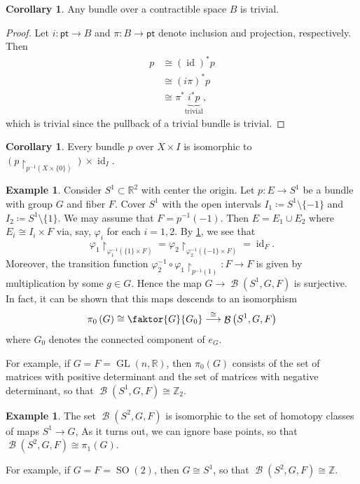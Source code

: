 \documentclass[10pt,letterpaper,cm]{nupset}
\theoremstyle{definition}
\newtheorem{exmp}[defn]{Example}
\theoremstyle{theorem}
\newtheorem{corollary}[defn]{Corollary}
\theoremstyle{remark}
\newcommand{\R}{\mathbb{R}}
\newcommand{\Z}{\mathbb Z}
\newcommand{\1}{\mathbb{1}}
\newcommand{\0}{\vec 0}
\newcommand{\pt}{\mathsf{pt}}
\DeclareMathOperator{\id}{id}
\DeclareMathOperator{\GL}{GL}
\DeclareMathOperator{\SO}{SO}
\DeclareMathOperator{\B}{\mathcal{B}}
\begin{document}
\begin{corollary}
Any bundle over a contractible space $B$ is trivial.
\end{corollary}
\begin{proof}
Let $i : \pt \to B$ and $\pi : B \to \pt$ denote inclusion and projection, respectively. Then 
\begin{align*}
p &  \cong \left(\id\right)^{\ast}{p}
\\ & \cong \left(i{\pi}\right)^{\ast}{p}
\\ & \cong \pi^{\ast}\underbrace{{i^{\ast}}{p}}_{\text{trivial}},
\end{align*}
which is trivial since the pullback of a trivial bundle is trivial.
\end{proof}

\begin{corollary}\label{restiso}
Every bundle $p$ over $X\times I$ is isomorphic to $\left(p\restriction_{p^{-1}\left(X\times \{0\}\right)}\right) \times \id_I$.
\end{corollary}

\begin{exmp}
Consider $S^1 \subset \R^2$ with center the origin. Let $p: E \to S^1$ be a bundle with group $G$ and fiber $F$. Cover $S^1$ with the open intervals $I_1 \coloneqq S^1\setminus \{{-1}\}$ and $I_2 \coloneqq S^1\setminus \{1\}$. We may assume that $F= p^{-1}\left({-1}\right)$. Then $E = E_1 \cup E_2$ where $ E_i \cong I_i \times F$ via, say, $\varphi_i$ for each $i=1,2$. By \cref{restiso}, we see that $$\varphi_1\restriction_{\varphi_1^{-1}\left(\{1\} \times F\right)} = \varphi_2\restriction_{\varphi_2^{-1}\left(\{{-1}\} \times F\right)}= \id_F.$$ Moreover, the transition function $\varphi_2^{-1} \circ \varphi_1\restriction_{p^{-1}\left(1\right)} : F \to F$ is given by multiplication by some $g\in G$. Hence the map $G \to \B\left(S^1, G, F\right)$ is surjective. In fact, it can be shown that this maps descends to an isomorphism
$$\pi_0\left(G\right) \cong \faktor{G}{G_0} \overset{\cong}{\longrightarrow} \B\left(S^1, G, F\right)$$ 
where $G_0$ denotes the connected component of $e_G$. 

\smallskip

For example, if $G=F = \GL\left(n, \R\right)$, then $\pi_0(G)$ consists of the set of matrices with positive determinant and the set of matrices with negative determinant, so that $\B\left(S^1, G, F\right) \cong \Z_2$.
\end{exmp}

\begin{exmp}
The set $\B\left(S^2, G, F \right)$ is isomorphic to the set of homotopy classes of maps $S^1 \to G$, As it turns out, we can ignore base points, so that  $\B\left(S^2, G, F \right) \cong \pi_1\left(G\right)$. 

\smallskip

For example, if $G = F = \SO(2)$, then $G\cong S^1$, so that $\B\left(S^2, G, F \right) \cong \Z$.
\end{exmp}
\end{document}
